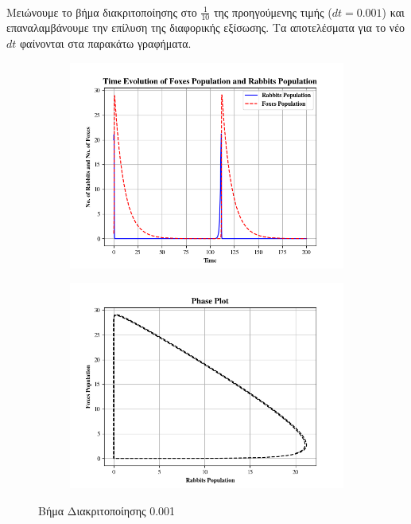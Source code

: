 \documentclass{article}
\begin{document}
\noindent
\\
Μειώνουμε το βήμα διακριτοποίησης στο $\frac{1}{10}$ της προηγούμενης τιμής ($ dt = 0.001 $) και επαναλαμβάνουμε την επίλυση της διαφορικής εξίσωσης. Τα αποτελέσματα για το νέο $ dt $ φαίνονται στα παρακάτω γραφήματα.
\newline
\newline
\begin{figure}[H]
    \centering
	\begin{adjustbox}{center}
		\begin{subfigure}[c]{.8\textwidth}    
			\includegraphics[width=1\textwidth,height=\textheight,keepaspectratio]{media/2/dt=0.001/Figure_1.png}
		\end{subfigure}%

	    \begin{subfigure}[c]{.8\textwidth}    
			\includegraphics[width=1\textwidth,height=\textheight,keepaspectratio]{media/2/dt=0.001/Figure_2.png}
		\end{subfigure}%
	\end{adjustbox}
\caption{Βήμα Διακριτοποίησης 0.001}
\label{(dt=0.001)}
\end{figure}
\end{document}
